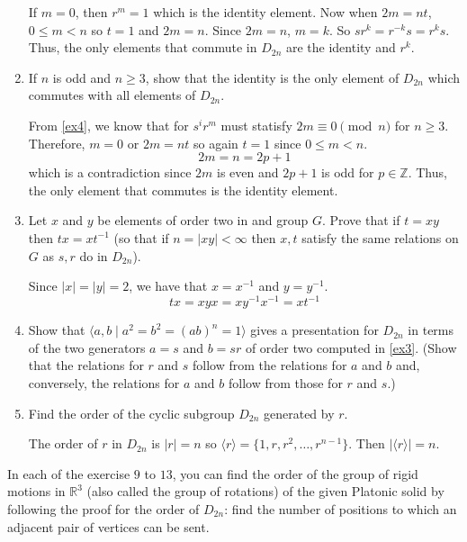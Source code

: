 \begin{enumerate}
  If \(m = 0\), then \(r^m = 1\) which is the identity element.
  Now when \(2m = nt\), \(0\leq m < n\) so \(t = 1\) and \(2m = n\).
  Since \(2m = n\), \(m = k\).
  So \(sr^k = r^{-k}s = r^ks\).
  Thus, the only elements that commute in \(D_{2n}\) are the identity and
  \(r^k\).
\item
  If \(n\) is odd and \(n\geq 3\), show that the identity is the only element
  of \(D_{2n}\) which commutes with all elements of \(D_{2n}\).
  \par\smallskip
  From \cref{ex4}, we know that for \(s^ir^m\) must statisfy
  \(2m\equiv 0\pmod{n}\) for \(n\geq 3\).
  Therefore, \(m = 0\) or \(2m = nt\) so again \(t = 1\) since \(0\leq m < n\).
  \[
  2m = n = 2p + 1
  \]
  which is a contradiction since \(2m\) is even and \(2p + 1\) is odd for
  \(p\in\mathbb{Z}\).
  Thus, the only element that commutes is the identity element.
\item
  Let \(x\) and \(y\) be elements of order two in and group \(G\).
  Prove that if \(t = xy\) then \(tx = xt^{-1}\) (so that if
  \(n = \lvert xy\rvert < \infty\) then \(x,t\) satisfy the same relations on
  \(G\) as \(s,r\) do in \(D_{2n}\)).
  \par\smallskip
  Since \(\lvert x\rvert = \lvert y\rvert = 2\), we have that \(x = x^{-1}\)
  and \(y = y^{-1}\).
  \[
  tx = xyx = xy^{-1}x^{-1} = xt^{-1}
  \]
\item
  Show that \(\langle a,b\mid a^2 = b^2 = (ab)^n = 1\rangle\) gives a
  presentation for \(D_{2n}\) in terms of the two generators \(a = s\) and
  \(b = sr\) of order two computed in \cref{ex3}.
  (Show that the relations for \(r\) and \(s\) follow from the relations for
  \(a\) and \(b\) and, conversely, the relations for \(a\) and \(b\) follow
  from those for \(r\) and \(s\).)
  \par\smallskip
  
\item
  Find the order of the cyclic subgroup \(D_{2n}\) generated by \(r\).
  \par\smallskip
  The order of \(r\) in \(D_{2n}\) is \(\lvert r\rvert = n\) so
  \(\langle r\rangle = \{1,r,r^2,\ldots,r^{n - 1}\}\).
  Then \(\lvert\langle r\rangle\rvert = n\).
\end{enumerate}
In each of the exercise \(9\) to \(13\), you can find the order of the group
of rigid motions in \(\mathbb{R}^3\) (also called the group of rotations) of
the given Platonic solid by following the proof for the order of \(D_{2n}\):
find the number of positions to which an adjacent pair of vertices can be sent.
